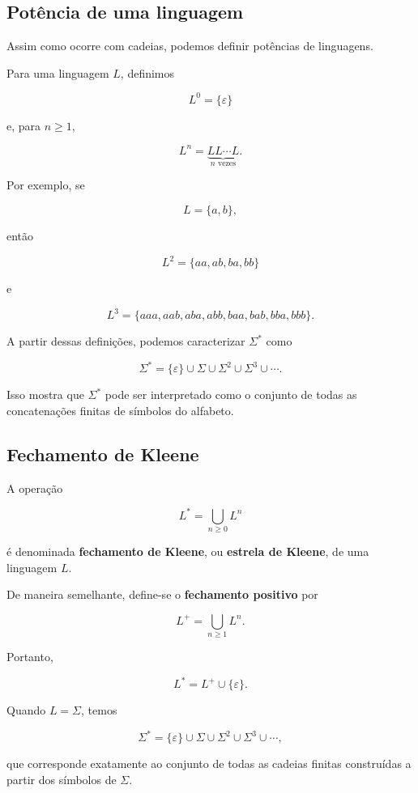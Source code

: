 \documentclass[
  brazilian,
  letterpaper,
]{book}
\theoremstyle{plain}
\theoremstyle{definition}
\theoremstyle{remark}
\begin{document}
\subsection{Potência de uma
linguagem}\label{potuxeancia-de-uma-linguagem}

Assim como ocorre com cadeias, podemos definir potências de linguagens.

Para uma linguagem \(L\), definimos

\[
L^0=\{\varepsilon\}
\]

e, para \(n\geq1\),

\[
L^n=
\underbrace{LL\cdots L}_{n\text{ vezes}}.
\]

Por exemplo, se

\[
L=\{a,b\},
\]

então

\[
L^2=
\{aa,ab,ba,bb\}
\]

e

\[
L^3=
\{aaa,aab,aba,abb,baa,bab,bba,bbb\}.
\]

A partir dessas definições, podemos caracterizar \(\Sigma^*\) como

\[
\Sigma^*
=
\{\varepsilon\}
\cup
\Sigma
\cup
\Sigma^2
\cup
\Sigma^3
\cup\cdots.
\]

Isso mostra que \(\Sigma^*\) pode ser interpretado como o conjunto de
todas as concatenações finitas de símbolos do alfabeto.

\subsection{Fechamento de Kleene}\label{fechamento-de-kleene}

A operação

\[
L^*=
\bigcup_{n\geq0}L^n
\]

é denominada \textbf{fechamento de Kleene}, ou \textbf{estrela de
Kleene}, de uma linguagem \(L\).

De maneira semelhante, define-se o \textbf{fechamento positivo} por

\[
L^+=
\bigcup_{n\geq1}L^n.
\]

Portanto,

\[
L^*=L^+\cup\{\varepsilon\}.
\]

Quando \(L=\Sigma\), temos

\[
\Sigma^*=
\{\varepsilon\}
\cup
\Sigma
\cup
\Sigma^2
\cup
\Sigma^3
\cup\cdots,
\]

que corresponde exatamente ao conjunto de todas as cadeias finitas
construídas a partir dos símbolos de \(\Sigma\).
\end{document}
